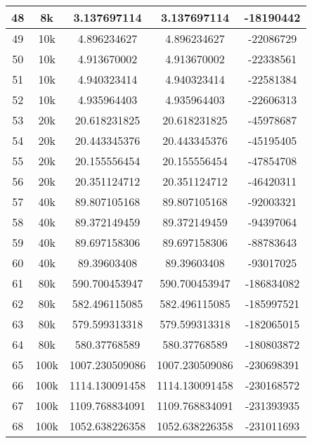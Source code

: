 \begin{center}
\begin{longtable}{|c|c|c|c|c|}
		48 & 8k & 3.137697114 & 3.137697114 & -18190442\\
		\hline
		49 & 10k & 4.896234627 & 4.896234627 & -22086729\\
		50 & 10k & 4.913670002 & 4.913670002 & -22338561\\
		51 & 10k & 4.940323414 & 4.940323414 & -22581384\\
		52 & 10k & 4.935964403 & 4.935964403 & -22606313\\
		\hline
		53 & 20k & 20.618231825 & 20.618231825 & -45978687\\
		54 & 20k & 20.443345376 & 20.443345376 & -45195405\\
		55 & 20k & 20.155556454 & 20.155556454 & -47854708\\
		56 & 20k & 20.351124712 & 20.351124712 & -46420311\\
		\hline
		57 & 40k & 89.807105168 & 89.807105168 & -92003321\\
		58 & 40k & 89.372149459 & 89.372149459 & -94397064\\
		59 & 40k & 89.697158306 & 89.697158306 & -88783643\\
		60 & 40k & 89.39603408 & 89.39603408 & -93017025\\
		\hline
		61 & 80k & 590.700453947 & 590.700453947 & -186834082\\
		62 & 80k & 582.496115085 & 582.496115085 & -185997521\\
		63 & 80k & 579.599313318 & 579.599313318 & -182065015\\
		64 & 80k & 580.37768589 & 580.37768589 & -180803872\\
		\hline
		65 & 100k & 1007.230509086 & 1007.230509086 & -230698391\\
		66 & 100k & 1114.130091458 & 1114.130091458 & -230168572\\
		67 & 100k & 1109.768834091 & 1109.768834091 & -231393935\\
		68 & 100k & 1052.638226358 & 1052.638226358 & -231011693\\
	\end{longtable}
\end{center}
